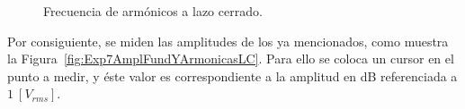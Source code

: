       \begin{figure}[H]
        \centering
          \caption{Frecuencia de armónicos a lazo cerrado.}
          \label{fig:Exp7FrecLazoCerrado}
      \end{figure}

      Por consiguiente, se miden las amplitudes de los ya mencionados, como muestra la 
      Figura~\ref{fig:Exp7AmplFundYArmonicasLC}. Para ello se coloca un cursor en el punto 
      a medir, y éste valor es correspondiente a la amplitud en dB referenciada a $1~[V_{rms}]$.

